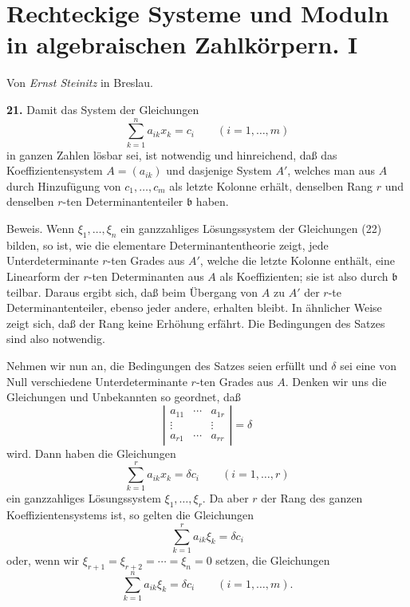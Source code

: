 \documentclass[11pt,a4paper]{article}
\begin{document}
\section*{Rechteckige Systeme und Moduln in algebraischen Zahlkörpern. I}
\begin{center}
Von \emph{Ernst Steinitz} in Breslau.
\end{center}


\textbf{21.} Damit das System der Gleichungen
\[
 \sum_{k=1}^{n} a_{ik}x_k=c_i\qquad(i=1,\ldots,m) \tag{22}
\]
in ganzen Zahlen lösbar sei, ist notwendig und hinreichend, daß das Koeffizientensystem \(A=(a_{ik})\) und dasjenige System \(A'\), welches man aus \(A\) durch Hinzufügung von \(c_1,\ldots,c_m\) als letzte Kolonne erhält, denselben Rang \(r\) und denselben \(r\)-ten Determinantenteiler \(\mathfrak b\) haben.

Beweis. Wenn \(\xi_1,\ldots,\xi_n\) ein ganzzahliges Lösungssystem der Gleichungen (22) bilden, so ist, wie die elementare Determinantentheorie zeigt, jede Unterdeterminante \(r\)-ten Grades aus \(A'\), welche die letzte Kolonne enthält, eine Linearform der \(r\)-ten Determinanten aus \(A\) als Koeffizienten; sie ist also durch \(\mathfrak b\) teilbar. Daraus ergibt sich, daß beim Übergang von \(A\) zu \(A'\) der \(r\)-te Determinantenteiler, ebenso jeder andere, erhalten bleibt. In ähnlicher Weise zeigt sich, daß der Rang keine Erhöhung erfährt. Die Bedingungen des Satzes sind also notwendig.

Nehmen wir nun an, die Bedingungen des Satzes seien erfüllt und \(\delta\) sei eine von Null verschiedene Unterdeterminante \(r\)-ten Grades aus \(A\). Denken wir uns die Gleichungen und Unbekannten so geordnet, daß
\[
 \left|\begin{array}{ccc}
 a_{11}&\cdots&a_{1r}\\
 \vdots&&\vdots\\
 a_{r1}&\cdots&a_{rr}
 \end{array}\right|=\delta
\]
wird. Dann haben die Gleichungen
\[
 \sum_{k=1}^{r}a_{ik}x_k=\delta c_i \qquad(i=1,\ldots,r)
\]
ein ganzzahliges Lösungssystem \(\xi_1,\ldots,\xi_r\). Da aber \(r\) der Rang des ganzen Koeffizientensystems ist, so gelten die Gleichungen
\[
 \sum_{k=1}^{r}a_{ik}\xi_k=\delta c_i
\]
oder, wenn wir \(\xi_{r+1}=\xi_{r+2}=\cdots=\xi_n=0\) setzen, die Gleichungen
\[
 \sum_{k=1}^{n}a_{ik}\xi_k=\delta c_i\qquad(i=1,\ldots,m). \tag{23}
\]
\end{document}
